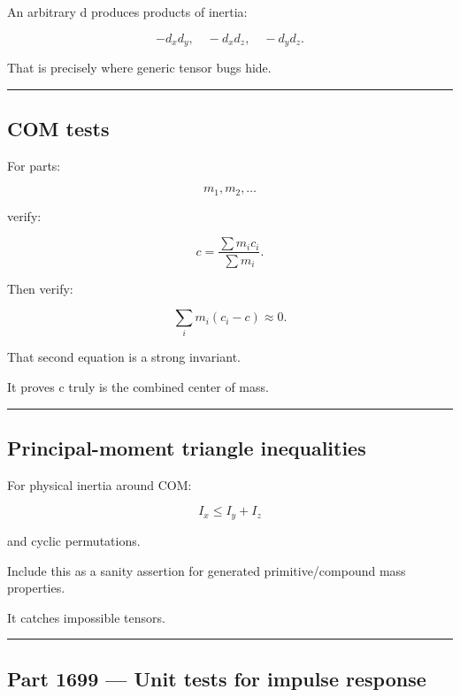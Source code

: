 An arbitrary d produces products of inertia:

\[
-d_xd_y,
\quad
-d_xd_z,
\quad
-d_yd_z.
\]

That is precisely where generic tensor bugs hide.

\begin{center}\rule{0.5\linewidth}{0.5pt}\end{center}

\subsection{COM tests}\label{06-engine-ii-ch039-com-tests}

For parts:

\[
m_1,m_2,\ldots
\]

verify:

\[
c
=
\frac{\sum m_ic_i}{\sum m_i}.
\]

Then verify:

\[
\sum_i
m_i(c_i-c)
\approx0.
\]

That second equation is a strong invariant.

It proves c truly is the combined center of mass.

\begin{center}\rule{0.5\linewidth}{0.5pt}\end{center}

\subsection{Principal-moment triangle inequalities}\label{06-engine-ii-ch039-principal-moment-triangle-inequalities}

For physical inertia around COM:

\[
I_x\le I_y+I_z
\]

and cyclic permutations.

Include this as a sanity assertion for generated primitive/compound mass properties.

It catches impossible tensors.

\begin{center}\rule{0.5\linewidth}{0.5pt}\end{center}

\subsection{Part 1699 --- Unit tests for impulse response}\label{06-engine-ii-ch039-part-1699-unit-tests-for-impulse-response}

